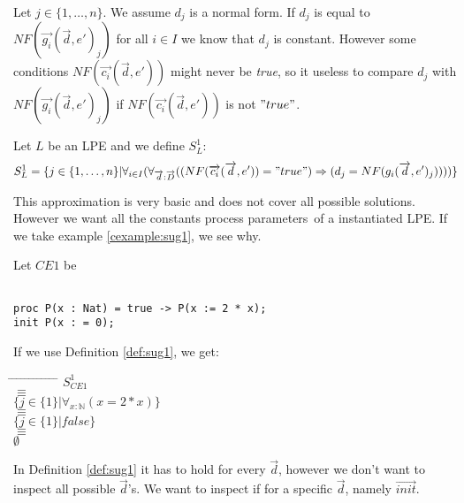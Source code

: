 \index{}\documentclass[a4paper,10pt]{article}
\theoremstyle{plain}
\theoremstyle{definition}
\newcommand{\ovr}{\overrightarrow}
\newcommand{\pps}{process parameters}
\newcommand{\ti}{\textit}
\newcommand{\tab}{\hspace*{5.mm} \= \hspace*{5.mm} \= \hspace*{5.mm} \= \hspace*{5.mm} \= \hspace*{5.mm} \= \hspace*{5.mm}  \= \hspace*{5.mm}  \= \hspace*{5.mm}  \= \hspace*{5.mm} \= \hspace*{5.mm} \= \hspace*{5.mm}  \= \hspace*{5.mm}  \= \hspace*{5.mm}\kill}
\begin{document}
Let $j \in \lbrace 1, \ldots,  n \rbrace $. We assume $d_j$ is a normal form. If $d_j$ is equal to $NF(\ovr{g_i}(\ovr{d},e')_j)$ for all $i \in I$ we know that $d_j$ is constant. However some conditions $NF(\ovr{c_i}(\ovr{d},e'))$ might never be \ti{true}, so it useless to compare $d_j$ with $NF(\ovr{g_i}(\ovr{d},e')_j)$  if $NF(\ovr{c_i}(\ovr{d},e'))$ is not  $"true"$. \\

\begin{defn} \label{def:sug1} Let $L$ be an LPE and we define $S_L^1$:
\begin{displaymath}
S_L^1 =
\lbrace   
j \in \lbrace 1, \ldots , n \rbrace \vert \forall_{i\in I} (\forall_{\ovr{d}: \ovr{D}}((NF(\ovr{c_i}(\ovr{d},e')) = "true")  \Rightarrow (d_j = NF(g_i(\ovr{d},e')_j))))\rbrace
\end{displaymath}

 
This approximation is very basic and does not cover all possible solutions. However we want all
the constants \pps\ of a instantiated LPE. If we take example
\ref{cexample:sug1}, we see why.
\begin{example}Let $CE1$ be \label{cexample:sug1}\begin{verbatim}

proc P(x : Nat) = true -> P(x := 2 * x);
init P(x : = 0);

\end{verbatim}
\end{example}
\begin{flushleft}
If we use Definition \ref{def:sug1}, we get:\\
\end{flushleft}
\begin{tabbing}
\tab
\> \> $S_{CE1}^1$\\
\> $\equiv$\\
\> \> $\lbrace j \in \lbrace 1 \rbrace \vert \forall_{x : \mathbb{N}}( x = 2 \ast x ) \rbrace $\\
\> $\equiv$ \\
\> \> $\lbrace j \in \lbrace 1 \rbrace \vert false \rbrace $\\
\> $\equiv$ \\
\> \> $\emptyset$ \\
\end{tabbing}
In Definition \ref{def:sug1} it has to hold for every $\ovr{d}$, however
we don't want to inspect all possible $\ovr{d}$'s. We want to inspect if for a specific $\ovr{d}$, namely $\ovr{init}$.
\end{defn}
\end{document}
